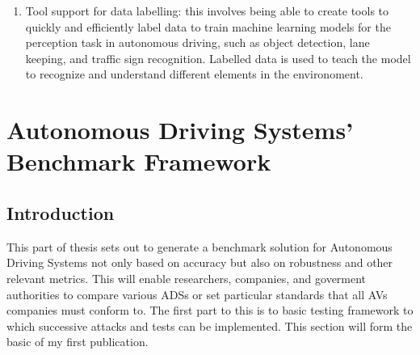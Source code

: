 \documentclass[a4paper]{article}
\begin{document}
\begin{enumerate}
  \item Tool support for data labelling: this involves being able to create tools to quickly and efficiently label data to train machine learning models for the perception task in autonomous driving, such as object detection, lane keeping, and traffic sign recognition. Labelled data is used to teach the model to recognize and understand different elements in the environoment.
\end{enumerate}
  
\pagebreak


\section{Autonomous Driving Systems' Benchmark Framework} \label{sec:benchmark}
\subsection{Introduction}
This part of thesis sets out to generate a benchmark solution for Autonomous Driving Systems not only based on accuracy but also on robustness and other relevant metrics. This will enable researchers, companies, and goverment authorities to compare various ADSs or set particular standards that all AVs companies must conform to. The first part to this is to basic testing framework to which successive attacks and tests can be implemented. This section will form the basic of my first publication.

\vspace{.1cm}
\end{document}
